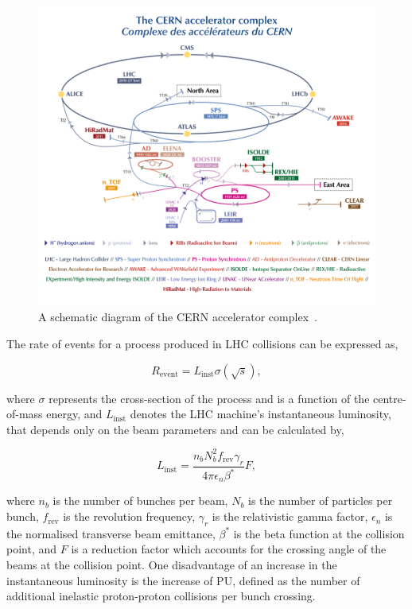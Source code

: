 \begin{figure}[t]
    \centering
    \includegraphics[width=\textwidth]{Figures/cern.png}
    \caption{A schematic diagram of the CERN accelerator complex~\cite{Bartosik:2847538}.}
    \label{fig:CERN_Schematic}
\end{figure}

The rate of events for a process produced in \ac{LHC} collisions can be expressed as,

\begin{equation}
R_{\text{event}} = L_{\text{inst}} \sigma(\sqrt{s}), 
\end{equation}

where $\sigma$ represents the cross-section of the process and is a function of the centre-of-mass energy, and $L_{\text{inst}}$ denotes the \ac{LHC} machine's instantaneous luminosity, that depends only on the beam parameters and can be calculated by,

\begin{equation}
L_{\text{inst}} = \frac{n_{b}N_{b}^{2}f_{\text{rev}}\gamma_{r}}{4\pi \epsilon_{n}\beta^{*}}F,
\end{equation}

where $n_b$ is the number of bunches per beam, $N_b$ is the number of particles per bunch, $f_{\text{rev}}$ is the revolution frequency, $\gamma_r$ is the relativistic gamma factor, $\epsilon_n$ is the normalised transverse beam emittance, $\beta^*$ is the beta function at the collision point, and $F$ is a reduction factor which accounts for the crossing angle of the beams at the collision point. 
One disadvantage of an increase in the instantaneous luminosity is the increase of \ac{PU}, defined as the number of additional inelastic proton-proton collisions per bunch crossing.

